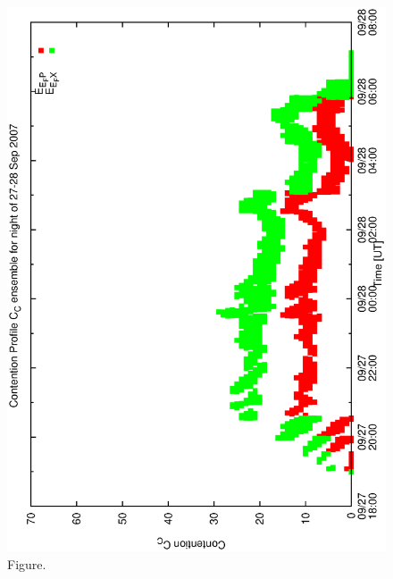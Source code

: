 \documentclass[12pt,a4paper]{article}
\begin{document}
\begin{figure}[htbp]
 \begin{center}
  \includegraphics[scale=1.0, angle=0]{figures/dwsfix6b_ensemble.eps}
 \end{center}
  \caption[Figure.]
{Figure.}
\end{figure}
\clearpage
\end{document}
